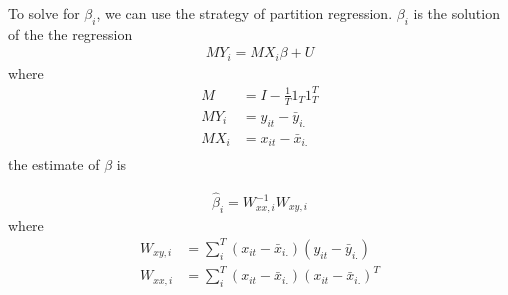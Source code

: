 \documentclass[a4paper]{article}
\begin{document}
To solve for $\beta_i$, we can use the strategy of partition regression. $\beta_i$ is the solution of the the regression
\begin{align*}
MY_i= MX_i\beta + U
\end{align*}
where 
\begin{align*}
M & = I -\frac{1}{T}1_T 1_T^{T} \\
MY_i & = y_{it}-\bar y_{i.} \\
MX_i & = x_{it}-\bar x_{i.} \\
\end{align*}
 the estimate of $\beta$ is

\begin{align*}
\hat \beta_i = W_{xx,i}^{-1}W_{xy,i}
\end{align*}
where 
\begin{align*}
W_{xy,i} &= \sum_i^T(x_{it}-\bar x_{i.})(y_{it}-\bar y_{i.}) \\
W_{xx,i} &= \sum_i^T(x_{it}-\bar x_{i.})(x_{it}-\bar x_{i.})^T
\end{align*}
\end{document}
